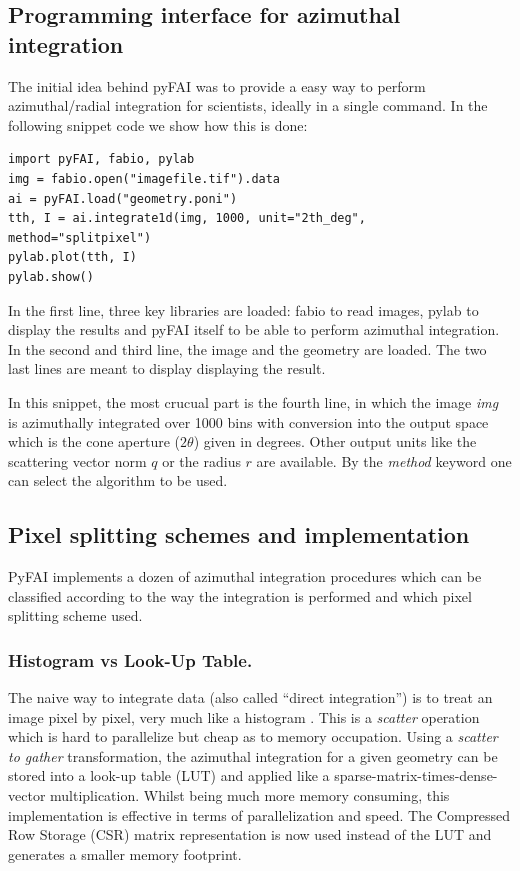 \documentclass[preprint]{iucr}
\begin{document}
\subsection{Programming interface for azimuthal integration}

The initial idea behind pyFAI was to provide a easy way to perform
azimuthal/radial integration for scientists, ideally in a single command.
In the following snippet code we show how this is done:

\begin{verbatim}
import pyFAI, fabio, pylab
img = fabio.open("imagefile.tif").data
ai = pyFAI.load("geometry.poni")
tth, I = ai.integrate1d(img, 1000, unit="2th_deg", method="splitpixel")
pylab.plot(tth, I)
pylab.show()
\end{verbatim}

In the first line, three key libraries are loaded: fabio \cite{fabio} to read
images, pylab \cite{matplotlib} to display the results and pyFAI itself to be
able to perform azimuthal integration.
In the second and third line,  the image and the geometry are loaded.
The two last lines are meant to display displaying the result.

In this snippet, the most crucual part is the fourth line, in which the image
\textit{img} is azimuthally integrated over 1000 bins with conversion  into
the output space which is the cone aperture ($2\theta$) given in degrees.
Other output units like the scattering vector norm $q$ or the radius $r$ are
available. By the \textit{method} keyword one can select the
algorithm to be used.

\subsection{Pixel splitting schemes and implementation}

PyFAI implements a dozen of azimuthal integration procedures which can be
classified according to the way the integration is performed and which pixel
splitting scheme used.

\subsubsection{Histogram vs Look-Up Table.}
The naive way to integrate data (also called ``direct integration'') is to treat
an image pixel by pixel, very much like a histogram .
This is a \textit{scatter} operation which is hard to parallelize but cheap as
to memory occupation.
Using a \textit{scatter to gather} transformation, the azimuthal integration for
a given geometry can be stored into a look-up table (LUT) and applied like a
sparse-matrix-times-dense-vector multiplication.
Whilst being much more memory consuming, this
implementation is effective in terms of parallelization and speed.
The Compressed Row Storage (CSR) matrix representation is now used instead of
the LUT and generates a smaller memory footprint.
\end{document}

